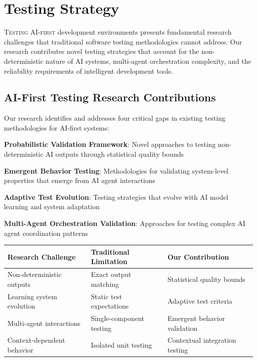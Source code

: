 
\section*{Testing Strategy}

\lettrine{T}{esting AI-first} development environments presents fundamental research challenges that traditional software testing methodologies cannot address. Our research contributes novel testing strategies that account for the non-deterministic nature of AI systems, multi-agent orchestration complexity, and the reliability requirements of intelligent development tools.

\subsection*{AI-First Testing Research Contributions}

Our research identifies and addresses four critical gaps in existing testing methodologies for AI-first systems:

\begin{expandedlist}
    \item \textbf{Probabilistic Validation Framework}: Novel approaches to testing non-deterministic AI outputs through statistical quality bounds
    \item \textbf{Emergent Behavior Testing}: Methodologies for validating system-level properties that emerge from AI agent interactions
    \item \textbf{Adaptive Test Evolution}: Testing strategies that evolve with AI model learning and system adaptation
    \item \textbf{Multi-Agent Orchestration Validation}: Approaches for testing complex AI agent coordination patterns
\end{expandedlist}

\begin{center}
\begin{tabular}{@{}lll@{}}
\toprule
\textbf{Research Challenge} & \textbf{Traditional Limitation} & \textbf{Our Contribution} \\
\midrule
Non-deterministic outputs & Exact output matching & Statistical quality bounds \\
Learning system evolution & Static test expectations & Adaptive test criteria \\
Multi-agent interactions & Single-component testing & Emergent behavior validation \\
Context-dependent behavior & Isolated unit testing & Contextual integration testing \\
\bottomrule
\end{tabular}
\end{center}

